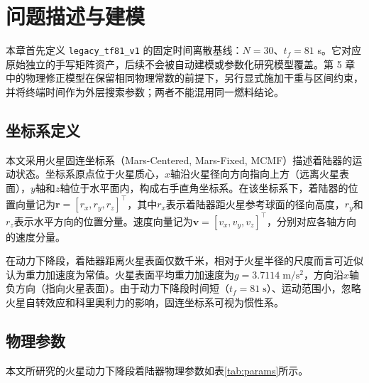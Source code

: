 \section{问题描述与建模}

本章首先定义 \texttt{legacy\_tf81\_v1} 的固定时间离散基线：$N=30$、$t_f=81$ s。它对应原始独立的手写矩阵资产，后续不会被自动建模或参数化研究模型覆盖。第 5 章中的物理修正模型在保留相同物理常数的前提下，另行显式施加干重与区间约束，并将终端时间作为外层搜索参数；两者不能混用同一燃料结论。

\subsection{坐标系定义}

本文采用火星固连坐标系（Mars-Centered, Mars-Fixed, MCMF）描述着陆器的运动状态。坐标系原点位于火星质心，$x$轴沿火星径向方向指向上方（远离火星表面），$y$轴和$z$轴位于水平面内，构成右手直角坐标系。在该坐标系下，着陆器的位置向量记为$\bm{r} = [r_x, r_y, r_z]^{\top}$，其中$r_x$表示着陆器距火星参考球面的径向高度，$r_y$和$r_z$表示水平方向的位置分量。速度向量记为$\bm{v} = [v_x, v_y, v_z]^{\top}$，分别对应各轴方向的速度分量。

在动力下降段，着陆器距离火星表面仅数千米，相对于火星半径的尺度而言可近似认为重力加速度为常值。火星表面平均重力加速度为$g = 3.7114\;\mathrm{m/s^2}$，方向沿$x$轴负方向（指向火星表面）。由于动力下降段时间短（$t_f = 81\;\mathrm{s}$）、运动范围小，忽略火星自转效应和科里奥利力的影响，固连坐标系可视为惯性系。

\subsection{物理参数}

本文所研究的火星动力下降段着陆器物理参数如表\ref{tab:params}所示。

